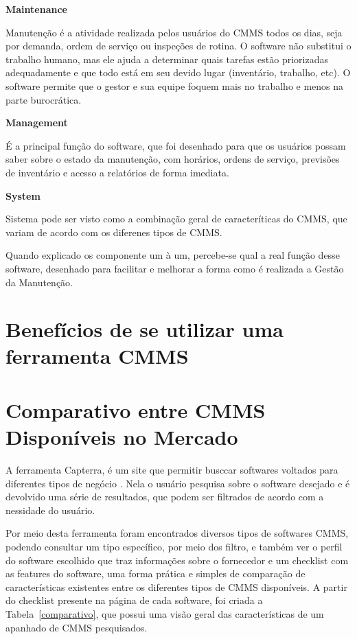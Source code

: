 \textbf{Maintenance}

Manutenção é a atividade realizada pelos usuários do CMMS todos os dias, seja por demanda, ordem de serviço ou inspeções de rotina. O software não substitui o trabalho humano, mas ele ajuda a determinar quais tarefas estão priorizadas adequadamente e que todo está em seu devido lugar (inventário, trabalho, etc). O software permite que o gestor e sua equipe foquem mais no trabalho e menos na parte burocrática. 

\textbf{Management}

É a principal função do software, que foi desenhado para que os usuários possam saber sobre o estado da manutenção, com horários, ordens de serviço, previsões de inventário e acesso a relatórios de forma imediata. 

\textbf{System}

Sistema pode ser visto como a combinação geral de caracteríticas do CMMS, que variam de acordo com os diferenes tipos de CMMS.

Quando explicado os componente um à um, percebe-se qual a real função desse software, desenhado para facilitar e melhorar a forma como é realizada a Gestão da Manutenção. 

\section{Benefícios de se utilizar uma ferramenta CMMS}







\section{Comparativo entre CMMS Disponíveis no Mercado}

A ferramenta Capterra, é um site que permitir busccar softwares voltados para diferentes tipos de negócio \cite{capterra}. Nela o usuário pesquisa sobre o software desejado e é devolvido uma série de resultados, que podem ser filtrados de acordo com a nessidade do usuário.

Por meio desta ferramenta foram encontrados diversos tipos de softwares CMMS, podendo consultar um tipo específico, por meio dos filtro, e também ver o perfil do software escolhido que traz informações sobre o fornecedor e um checklist com as features do software, uma forma prática e simples de comparação de características existentes entre os diferentes tipos de CMMS disponíveis. A partir do checklist presente na página de cada software, foi criada a Tabela~\ref{comparativo}, que possui uma visão geral das características de um apanhado de CMMS pesquisados.

